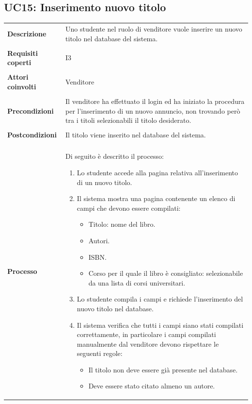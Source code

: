 \documentclass[10pt,a4paper]{article}
\begin{document}
	\subsection{UC15: Inserimento nuovo titolo}
	\begin{tabular}{lp{}}
		\textbf{Descrizione}&Uno studente nel ruolo di venditore vuole inserire un nuovo titolo nel database del sistema.\\
		\\
		\textbf{Requisiti coperti}&I3\\
		\\
		\textbf{Attori coinvolti}&Venditore\\
		\\
		\textbf{Precondizioni}&Il venditore ha effettuato il login ed ha iniziato la procedura per l'inserimento di un nuovo annuncio, non trovando però tra i titoli selezionabili il titolo desiderato.\\
		\\
		\textbf{Postcondizioni}&Il titolo viene inserito nel database del sistema.\\
		\\
		\textbf{Processo}&Di seguito è descritto il processo:
		\begin{enumerate}
			\item Lo studente accede alla pagina relativa all'inserimento di un nuovo titolo.
			\item Il sistema mostra una pagina contenente un elenco di campi che devono essere compilati:
			\begin{itemize}
				\item Titolo: nome del libro.
				\item Autori.
				\item ISBN.
				\item Corso per il quale il libro è consigliato: selezionabile da una lista di corsi universitari.
			\end{itemize}
			\item Lo studente compila i campi e richiede l'inserimento del nuovo titolo nel database.
			\item Il sistema verifica che tutti i campi siano stati compilati correttamente, in particolare i campi compilati manualmente dal venditore devono rispettare le seguenti regole:
			\begin{itemize}
				\item Il titolo non deve essere già presente nel database.
				\item Deve essere stato citato almeno un autore.

\end{itemize}
\end{enumerate}
\end{tabular}
\end{document}
